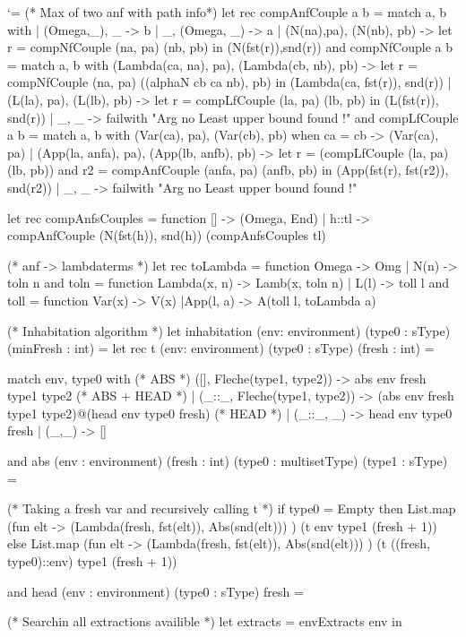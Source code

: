 \documentclass{article}
\let\origlstlisting=\lstlisting
\let\endoriglstlisting=\endlstlisting
\renewenvironment{lstlisting}
{\mathcode`\-=\hyphenmathcode
    \everymath{}\mathsurround=0pt\origlstlisting}
{\endoriglstlisting}
\begin{document}
\begin{lstlisting}
(* Max of two anf with path info*)
let rec compAnfCouple a b = match a, b with
  | (Omega,_), _ -> b
  |  _, (Omega, _) -> a
  | (N(na),pa), (N(nb), pb) -> let r = compNfCouple (na, pa) (nb, pb) in (N(fst(r)),snd(r))
and compNfCouple a b =  match a, b with
    (Lambda(ca, na), pa), (Lambda(cb, nb), pb) -> 
        let r = compNfCouple (na, pa) ((alphaN cb ca nb), pb) in
						  (Lambda(ca, fst(r)), snd(r))
  | (L(la), pa), (L(lb), pb) -> let r = compLfCouple (la, pa) (lb, pb) in (L(fst(r)), snd(r))
  | _, _ -> failwith "Arg no Least upper bound found !"
and compLfCouple a b = match a, b with
    (Var(ca), pa), (Var(cb), pb) when ca = cb -> (Var(ca), pa)
  | (App(la, anfa), pa), (App(lb, anfb), pb) -> let r = (compLfCouple (la, pa) (lb, pb))
  and r2 = compAnfCouple (anfa, pa) (anfb, pb) in (App(fst(r), fst(r2)), snd(r2))
  | _, _ -> failwith "Arg no Least upper bound found !"

let rec compAnfsCouples = function
[] -> (Omega, End)
 | h::tl -> compAnfCouple (N(fst(h)), snd(h)) (compAnfsCouples tl)

(* anf -> lambdaterms *)
let rec toLambda = function
Omega -> Omg
  | N(n) -> toln n
and toln = function
Lambda(x, n) -> Lamb(x, toln n)
  | L(l) -> toll l
and toll = function
Var(x) -> V(x)
  |App(l, a) -> A(toll l, toLambda a)


(* Inhabitation algorithm *)
let inhabitation (env: environment) (type0 : sType) (minFresh : int)  =
  let rec t (env: environment) (type0 : sType) (fresh : int) =

    match env, type0 with
      (* ABS *)
      ([], Fleche(type1, type2)) -> abs env fresh type1 type2
      (* ABS + HEAD *)
    | (_::_, Fleche(type1, type2)) -> (abs env fresh type1 type2)@(head env type0 fresh)
      (* HEAD *)
    | (_::_, _) -> head env type0 fresh
    | (_,_) -> []


  and abs (env : environment) (fresh : int) (type0 : multisetType) (type1 : sType) = 

    (* Taking a fresh var and recursively calling t *)
    if type0 = Empty then
      List.map (fun elt -> (Lambda(fresh, fst(elt)), Abs(snd(elt))) ) 
          (t env type1 (fresh + 1))
    else
      List.map (fun elt -> (Lambda(fresh, fst(elt)), Abs(snd(elt))) ) 
          (t ((fresh, type0)::env) type1 (fresh + 1))

  and head (env : environment) (type0 : sType) fresh = 

    (* Searchin all extractions availible *)
    let extracts = envExtracts env in


\end{lstlisting}
\end{document}
